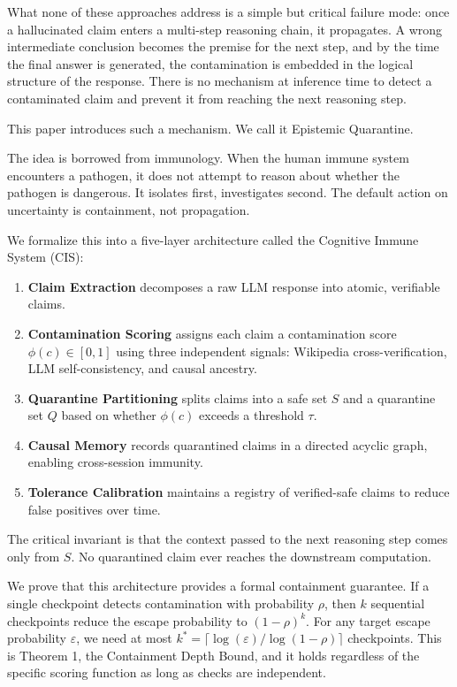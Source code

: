 \documentclass[11pt,a4paper]{article}
\begin{document}
What none of these approaches address is a simple but critical failure mode: once a hallucinated claim enters a multi-step reasoning chain, it propagates. A wrong intermediate conclusion becomes the premise for the next step, and by the time the final answer is generated, the contamination is embedded in the logical structure of the response. There is no mechanism at inference time to detect a contaminated claim and prevent it from reaching the next reasoning step.

This paper introduces such a mechanism. We call it Epistemic Quarantine.

The idea is borrowed from immunology. When the human immune system encounters a pathogen, it does not attempt to reason about whether the pathogen is dangerous. It isolates first, investigates second. The default action on uncertainty is containment, not propagation.

We formalize this into a five-layer architecture called the Cognitive Immune System (CIS):

\begin{enumerate}
    \item \textbf{Claim Extraction} decomposes a raw LLM response into atomic, verifiable claims.
    \item \textbf{Contamination Scoring} assigns each claim a contamination score $\phi(c) \in [0,1]$ using three independent signals: Wikipedia cross-verification, LLM self-consistency, and causal ancestry.
    \item \textbf{Quarantine Partitioning} splits claims into a safe set $S$ and a quarantine set $Q$ based on whether $\phi(c)$ exceeds a threshold $\tau$.
    \item \textbf{Causal Memory} records quarantined claims in a directed acyclic graph, enabling cross-session immunity.
    \item \textbf{Tolerance Calibration} maintains a registry of verified-safe claims to reduce false positives over time.
\end{enumerate}

The critical invariant is that the context passed to the next reasoning step comes only from $S$. No quarantined claim ever reaches the downstream computation.

We prove that this architecture provides a formal containment guarantee. If a single checkpoint detects contamination with probability $\rho$, then $k$ sequential checkpoints reduce the escape probability to $(1-\rho)^k$. For any target escape probability $\varepsilon$, we need at most $k^* = \lceil \log(\varepsilon) / \log(1-\rho) \rceil$ checkpoints. This is Theorem 1, the Containment Depth Bound, and it holds regardless of the specific scoring function as long as checks are independent.
\end{document}
